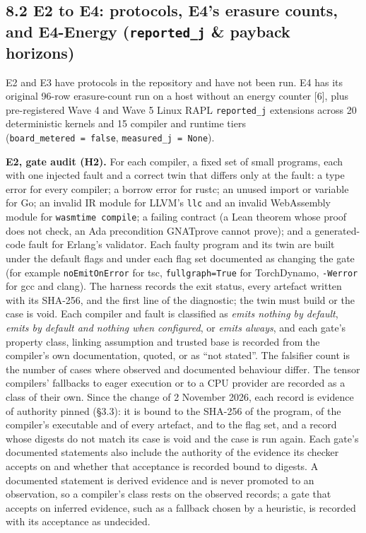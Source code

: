 \documentclass[10pt,letterpaper]{article}
\begin{document}
\subsection{\texorpdfstring{8.2 E2 to E4: protocols, E4's erasure
counts, and E4-Energy (\texttt{reported\_\allowbreak{}j} \& payback
horizons)}{8.2 E2 to E4: protocols, E4's erasure counts, and E4-Energy (reported\_j \& payback horizons)}}\label{e2-to-e4-protocols-e4s-erasure-counts-and-e4-energy-reported_j-payback-horizons}

E2 and E3 have protocols in the repository and have not been run. E4 has
its original 96-row erasure-count run on a host without an energy
counter {[}6{]}, plus pre-registered Wave 4 and Wave 5 Linux RAPL
\texttt{reported\_\allowbreak{}j} extensions across 20 deterministic kernels and 15
compiler and runtime tiers (\texttt{board\_\allowbreak{}metered\ =\ false},
\texttt{measured\_\allowbreak{}j\ =\ None}).

\textbf{E2, gate audit (H2).} For each compiler, a fixed set of small
programs, each with one injected fault and a correct twin that differs
only at the fault: a type error for every compiler; a borrow error for
rustc; an unused import or variable for Go; an invalid IR module for
LLVM's \texttt{llc} and an invalid WebAssembly module for
\texttt{wasmtime\ compile}; a failing contract (a Lean theorem whose
proof does not check, an Ada precondition GNATprove cannot prove); and a
generated-code fault for Erlang's validator. Each faulty program and its
twin are built under the default flags and under each flag set
documented as changing the gate (for example \texttt{noEmitOnError} for
tsc, \texttt{fullgraph=True} for TorchDynamo, \texttt{-Werror} for gcc
and clang). The harness records the exit status, every artefact written
with its SHA-256, and the first line of the diagnostic; the twin must
build or the case is void. Each compiler and fault is classified as
\emph{emits nothing by default}, \emph{emits by default and nothing when
configured}, or \emph{emits always}, and each gate's property class,
linking assumption and trusted base is recorded from the compiler's own
documentation, quoted, or as ``not stated''. The falsifier count is the
number of cases where observed and documented behaviour differ. The
tensor compilers' fallbacks to eager execution or to a CPU provider are
recorded as a class of their own. Since the change of 2 November 2026,
each record is evidence of authority pinned (§3.3): it is bound to the
SHA-256 of the program, of the compiler's executable and of every
artefact, and to the flag set, and a record whose digests do not match
its case is void and the case is run again. Each gate's documented
statements also include the authority of the evidence its checker
accepts on and whether that acceptance is recorded bound to digests. A
documented statement is derived evidence and is never promoted to an
observation, so a compiler's class rests on the observed records; a gate
that accepts on inferred evidence, such as a fallback chosen by a
heuristic, is recorded with its acceptance as undecided.
\end{document}
